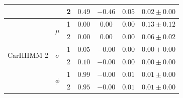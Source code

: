 \begin{table}
{\begin{tabular}{ccccccc}
                           &                               & 2                             & $0.49$                         & $-0.46$                     & $0.05$                             & $0.02 \pm 0.00$                             \\ \hline
\multirow{6}{*}{CarHHMM 2} & \multirow{2}{*}{$\mu$}        & 1                             & $0.00$                         & $0.00$                     & $0.00$                             & $0.13 \pm 0.12$                             \\
                           &                               & 2                             & $0.00$                         & $0.00$                     & $0.00$                             & $0.06 \pm 0.02$                             \\
                           & \multirow{2}{*}{$\sigma$}     & 1                             & $0.05$                         & $-0.00$                     & $0.00$                             & $0.00 \pm 0.00$                             \\
                           &                               & 2                             & $0.10$                         & $-0.00$                     & $0.00$                             & $0.00 \pm 0.00$                             \\ 
                           & \multirow{2}{*}{$\phi$}       & 1                             & $0.99$                         & $-0.00$                     & $0.01$                             & $0.01 \pm 0.00$                             \\
                           &                               & 2                             & $0.95$                         & $-0.00$                     & $0.01$                             & $0.01 \pm 0.00$                             \\ \hline
\end{tabular}
}
\label{table:acceleration}
\end{table}



